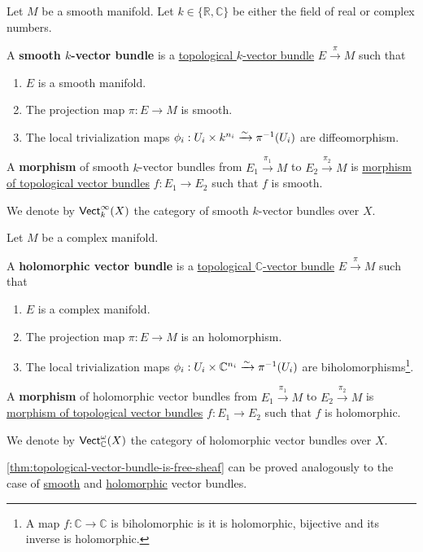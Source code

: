 \documentclass[../../../main]{subfiles}
\begin{document}
\begin{definition}\label{def:smooth-vector-bundle}
  Let \(M\) be a smooth manifold.
  Let \(k \in \{\mathbb{R}, \mathbb{C}\}\) be either the field of real or complex numbers.

  A \textbf{smooth \(k\)-vector bundle} is a \hyperref[def:topological-vector-bundle]{topological \(k\)-vector bundle} \(E \xrightarrow{\pi} M\) such that
  \begin{enumerate}
    \item \(E\) is a smooth manifold.
    \item The projection map \(\pi: E \to M\) is smooth.
    \item The local trivialization maps \(\phi_{i}: U_{i} \times k^{n_{i}} \xrightarrow{\sim} \pi^{-1}(U_{i})\) are diffeomorphism.
  \end{enumerate}

  
  A \textbf{morphism} of smooth \(k\)-vector bundles from \(E_{1} \xrightarrow{\pi_{1}} M\) to \(E_{2} \xrightarrow{\pi_{2}} M\) is \hyperref[def:topological-vector-bundle]{morphism of topological vector bundles} \(f: E_{1} \to E_{2}\) such that \(f\) is smooth.

  We denote by \(\mathsf{Vect}_{k}^{\infty}(X)\) the category of smooth \(k\)-vector bundles over \(X\).
\end{definition}

\begin{definition}\label{def:holomorphic-vector-bundle}
  Let \(M\) be a complex manifold.

  A \textbf{holomorphic vector bundle} is a \hyperref[def:topological-vector-bundle]{topological \(\mathbb{C}\)-vector bundle} \(E \xrightarrow{\pi} M\) such that
  \begin{enumerate}
    \item \(E\) is a complex manifold.
    \item The projection map \(\pi: E \to M\) is an holomorphism.
    \item The local trivialization maps \(\phi_{i}: U_{i} \times \mathbb{C}^{n_{i}} \xrightarrow{\sim} \pi^{-1}(U_{i})\) are biholomorphisms\footnote{A map \(f: \mathbb{C} \to \mathbb{C}\) is biholomorphic is it is holomorphic, bijective and its inverse is holomorphic.}.
  \end{enumerate}

  
  A \textbf{morphism} of holomorphic vector bundles from \(E_{1} \xrightarrow{\pi_{1}} M\) to \(E_{2} \xrightarrow{\pi_{2}} M\) is \hyperref[def:topological-vector-bundle]{morphism of topological vector bundles} \(f: E_{1} \to E_{2}\) such that \(f\) is holomorphic.

  We denote by \(\mathsf{Vect}_{\mathbb{C}}^{\omega}(X)\) the category of holomorphic vector bundles over \(X\).
\end{definition}

\begin{remark}
  \autoref{thm:topological-vector-bundle-is-free-sheaf} can be proved analogously to the case of \hyperref[def:smooth-vector-bundle]{smooth} and \hyperref[def:holomorphic-vector-bundle]{holomorphic} vector bundles.
\end{remark}
\end{document}
